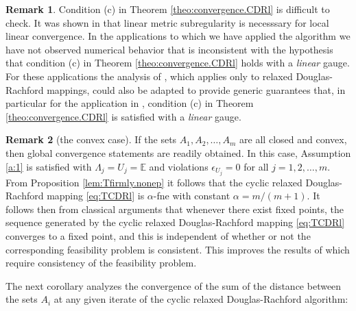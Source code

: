 \documentclass[12pt]{article}
\theoremstyle{definition}
\newtheorem{remark}{Remark}
\newcommand{\Ebb}{\mathbb{E}}
\begin{document}
\begin{remark}
Condition (c) in Theorem \ref{theo:convergence.CDRl} is difficult to check.
It was shown in \cite[Theorem 2]{LukTebTha18} that
linear metric subregularity is necesssary for local linear convergence.
In the applications to which we have applied the algorithm \cite{LukSabTeb19,DinJanLuk24} we have
not observed numerical behavior that is inconsistent with the hypothesis that
condition (c) in Theorem \ref{theo:convergence.CDRl} holds with a {\em linear} gauge.
For these applications the analysis of \cite{luke2020convergence}, which applies only
to relaxed Douglas-Rachford mappings, could also be adapted to provide generic
guarantees that, in particular for the application in \cite{DinJanLuk24},
condition (c) in Theorem \ref{theo:convergence.CDRl} is satisfied with a {\em linear} gauge.
\end{remark}


\begin{remark}[the convex case]
If the sets $A_1, A_2, \dots, A_m$ are all closed and convex, then global convergence statements are readily obtained.
In this case, Assumption \ref{a:1} is satisfied with $\Lambda_j=U_j=\Ebb$ and violations $\epsilon_{U_j} = 0$
for all $j=1,2,\dots,m$.  From Proposition \ref{lem:Tfirmly.nonep} it follows that the cyclic relaxed Douglas-Rachford
mapping \eqref{eq:TCDRl} is $\alpha$-fne with constant $\alpha=m/(m+1)$.  It follows then from classical arguments
that whenever there
exist fixed points, the sequence generated by the cyclic relaxed Douglas-Rachford
mapping \eqref{eq:TCDRl} converges to a fixed point, and this is independent of whether or not the
corresponding feasibility problem is consistent.  This improves the results of \cite{BorTam14,luke2018relaxed} which
require consistency of the feasibility problem.
\end{remark}

The next corollary analyzes the convergence of the sum of the distance between the sets $A_i$ at
any given iterate of the cyclic relaxed Douglas-Rachford algorithm:
\end{document}
